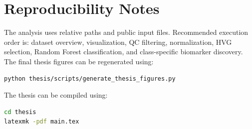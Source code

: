 \chapter{Reproducibility Notes}
The analysis uses relative paths and public input files. Recommended execution order is: dataset overview, visualization, QC filtering, normalization, HVG selection, Random Forest classification, and class-specific biomarker discovery. The final thesis figures can be regenerated using:
\begin{lstlisting}[language=bash]
python thesis/scripts/generate_thesis_figures.py
\end{lstlisting}
The thesis can be compiled using:
\begin{lstlisting}[language=bash]
cd thesis
latexmk -pdf main.tex
\end{lstlisting}
